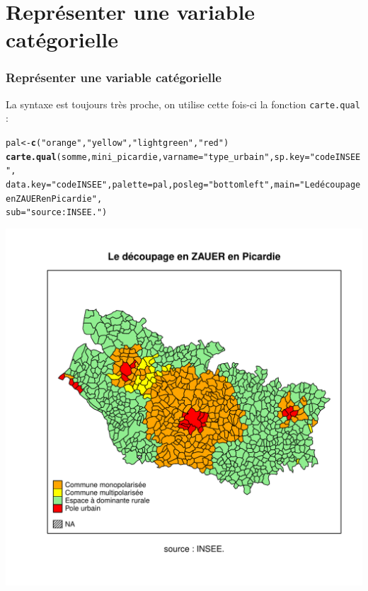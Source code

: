 \documentclass[slidetop, 10pt]{beamer}\usepackage{graphicx, color}
\makeatletter
\newcommand{\hlfunctioncall}[1]{\textcolor[rgb]{0.501960784313725,0,0.329411764705882}{\textbf{#1}}}%
\newcommand{\hlstring}[1]{\textcolor[rgb]{0.6,0.6,1}{#1}}%
\newenvironment{kframe}{%
 \def\at@end@of@kframe{}%
 \ifinner\ifhmode%
  \def\at@end@of@kframe{\end{minipage}}%
  \begin{minipage}{\columnwidth}%
 \fi\fi%
 \def\FrameCommand##1{\hskip\@totalleftmargin \hskip-\fboxsep
 \colorbox{shadecolor}{##1}\hskip-\fboxsep
     \hskip-\linewidth \hskip-\@totalleftmargin \hskip\columnwidth}%
 \MakeFramed {\advance\hsize-\width
   \@totalleftmargin\z@ \linewidth\hsize
   \@setminipage}}%
 {\par\unskip\endMakeFramed%
 \at@end@of@kframe}
\newenvironment{knitrout}{}{} %
\renewenvironment{knitrout}{\begin{tiny}}{\end{tiny}}
\makeatother
\begin{document}
\section{Représenter une variable catégorielle}
\begin{frame}[fragile]
\frametitle{Représenter une variable catégorielle}
La syntaxe est toujours très proche, on utilise cette fois-ci la fonction \verb!carte.qual! :

\begin{knitrout}\tiny
{}\color{fgcolor}\begin{kframe}
\begin{alltt}

pal <- \hlfunctioncall{c}(\hlstring{"orange"}, \hlstring{"yellow"}, \hlstring{"light green"}, \hlstring{"red"})
\hlfunctioncall{carte.qual}(somme, mini\_picardie, varname = \hlstring{"type\_urbain"}, sp.key = \hlstring{"codeINSEE"}, 
    data.key = \hlstring{"codeINSEE"}, palette = pal, posleg = \hlstring{"bottomleft"}, main = \hlstring{"Le découpage en ZAUER en Picardie"}, 
    sub = \hlstring{"source : INSEE."})
\end{alltt}
\end{kframe}

{\centering \includegraphics[width=.5\linewidth]{images/cartequal} 

}


\end{knitrout}


\end{frame}
\end{document}
